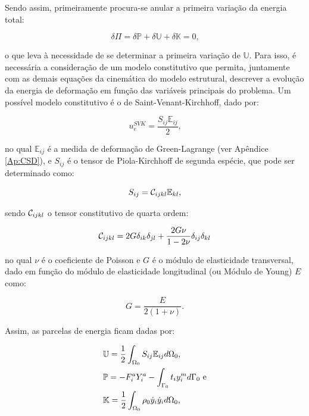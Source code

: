 Sendo assim, primeiramente procura-se anular a primeira variação da energia total:

\begin{equation}
    \delta\Pi=\delta\mathbb{P}+\delta\mathbb{U}+\delta\mathbb{K}=0\text{,}
\end{equation}

\noindent o que leva à necessidade de se determinar a primeira variação de $\mathbb{U}$. Para isso, é necessária a consideração de um modelo constitutivo que permita, juntamente com as demais equações da cinemática do modelo estrutural, descrever a evolução da energia de deformação em função das variáveis principais do problema. Um possível modelo constitutivo é o de Saint-Venant-Kirchhoff, dado por:

\begin{equation}
    u_e^{SVK}=\frac{S_{ij}\mathbb{E}_{ij}}{2}\text{,}
\end{equation}

\noindent no qual $\mathbb{E}_{ij}$ é a medida de deformação de Green-Lagrange (ver Apêndice \ref{Ap:CSD}), e $S_{ij}$ é o tensor de Piola-Kirchhoff de segunda espécie, que pode ser determinado como:

\begin{equation}
    S_{ij}=\mathcal{C}_{ijkl}\mathbb{E}_{kl}\text{,}
    \label{eq:CSD-S}
\end{equation}

\noindent sendo $\mathcal{C}_{ijkl}$ o tensor constitutivo de quarta ordem:

\begin{equation}
    \mathcal{C}_{ijkl}=2G\delta_{ik}\delta_{jl}+\frac{2G\nu}{1-2\nu}\delta_{ij}\delta_{kl}
\end{equation}

\noindent no qual $\nu$ é o coeficiente de Poisson e $G$ é o módulo de elasticidade transversal, dado em função do módulo de elasticidade longitudinal (ou Módulo de Young) $E$ como:

\begin{equation}
    G=\frac{E}{2(1+\nu)}\text{.}
\end{equation}

Assim, as parcelas de energia ficam dadas por:

\begin{subequations}
    \begin{align}
         & \mathbb{U}=\frac{1}{2}\int_{\Omega_0}{S_{ij}\mathbb{E}_{ij} d\Omega_0}\text{,}    \\
         & \mathbb{P}=-F_i^aY_i^a-\int_{\Gamma_0}{t_iy_i^m d\Gamma_0}\text{ e}             \\
         & \mathbb{K}=\frac{1}{2}\int_{\Omega_0}{\rho_0\dot{y}_i\dot{y}_i d\Omega_0}\text{,}
    \end{align}
\end{subequations}

